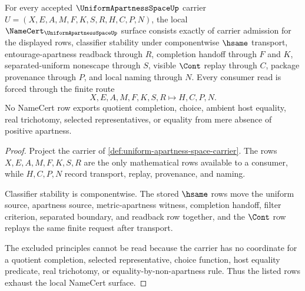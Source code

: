 \begin{theorem}
\label{thm:uniform-apartness-space-namecert-obligations}
For every accepted $\UniformApartnessSpaceUp$ carrier
$U=(X,E,A,M,F,K,S,R,H,C,P,N)$, the local
$\NameCert_{\UniformApartnessSpaceUp}$ surface consists exactly of carrier
admission for the displayed rows, classifier stability under componentwise
$\hsame$ transport, entourage-apartness readback through $R$, completion
handoff through $F$ and $K$, separated-uniform nonescape through $S$, visible
$\Cont$ replay through $C$, package provenance through $P$, and local naming
through $N$. Every consumer read is forced through the finite route
$$
X,E,A,M,F,K,S,R\longmapsto H,C,P,N .
$$
No NameCert row exports quotient completion, choice, ambient host equality,
real trichotomy, selected representatives, or equality from mere absence of
positive apartness.
\end{theorem}
\begin{proof}
Project the carrier of
\autoref{def:uniform-apartness-space-carrier}. The rows $X,E,A,M,F,K,S,R$ are
the only mathematical rows available to a consumer, while $H,C,P,N$ record
transport, replay, provenance, and naming.

Classifier stability is componentwise. The stored $\hsame$ rows move the
uniform source, apartness source, metric-apartness witness, completion handoff,
filter criterion, separated boundary, and readback row together, and the
$\Cont$ row replays the same finite request after transport.

The excluded principles cannot be read because the carrier has no coordinate
for a quotient completion, selected representative, choice function, host
equality predicate, real trichotomy, or equality-by-non-apartness rule. Thus
the listed rows exhaust the local NameCert surface.
\end{proof}

